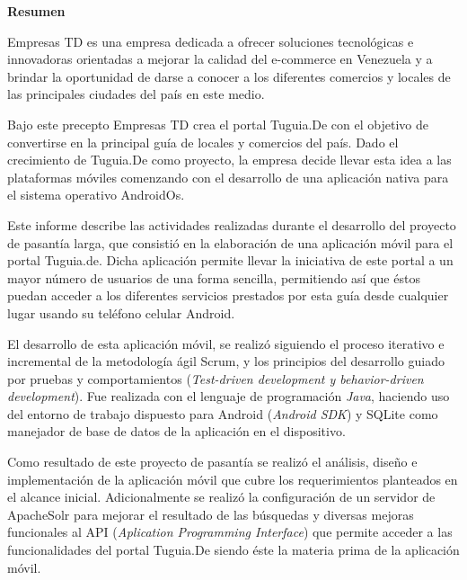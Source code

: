 \setcounter{page}{4}
\begin{center}
	{\bf Resumen}
\end{center}	

Empresas TD es una empresa dedicada a ofrecer soluciones tecnológicas e innovadoras orientadas a mejorar la calidad del e-commerce en Venezuela y a brindar la oportunidad de darse a conocer a los diferentes comercios y locales de las principales ciudades del país en este medio.

Bajo este precepto Empresas TD crea el portal Tuguia.De con el objetivo de convertirse en la 
principal guía de locales y comercios del país. Dado el crecimiento de Tuguia.De como proyecto, la empresa decide llevar esta idea a las plataformas móviles comenzando con el desarrollo de una aplicación nativa para el sistema operativo AndroidOs. 

Este informe describe las actividades realizadas durante el desarrollo del proyecto de pasantía larga, que consistió en la elaboración de una aplicación móvil para el portal Tuguia.de. Dicha aplicación permite llevar la iniciativa de este portal a un mayor número de usuarios de una forma sencilla, permitiendo así que éstos puedan acceder a los diferentes servicios prestados por esta guía desde cualquier lugar usando su teléfono celular Android.

El desarrollo de esta aplicación móvil, se realizó siguiendo el proceso iterativo e incremental de la metodología ágil Scrum, y los principios del desarrollo guiado por 
pruebas y comportamientos (\textit{Test-driven development y behavior-driven development}). 
Fue realizada con el lenguaje de programación \textit{Java}, haciendo uso del entorno de trabajo dispuesto para Android (\textit{Android SDK}) y SQLite como manejador de base de datos de la aplicación en el dispositivo.

Como resultado de este proyecto de pasantía se realizó el análisis, diseño e implementación de la aplicación móvil que cubre los requerimientos planteados en el alcance inicial. Adicionalmente se realizó la configuración de un servidor de ApacheSolr para mejorar
el resultado de las búsquedas y diversas mejoras funcionales al API (\textit{Aplication Programming Interface}) que permite acceder a las funcionalidades del portal Tuguia.De siendo 
éste la materia prima de la aplicación móvil.

